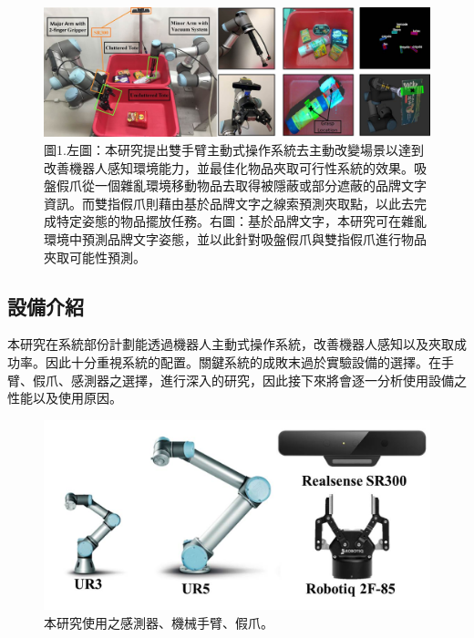 \begin{figure}[ht]
	\centering
	\includegraphics[height=!, width=1.0\linewidth, keepaspectratio=true]
	{./figures/hardware_archi.jpg}
  \caption{圖1.左圖：本研究提出雙手臂主動式操作系統去主動改變場景以達到改善機器人感知環境能力，並最佳化物品夾取可行性系統的效果。吸盤假爪從一個雜亂環境移動物品去取得被隱蔽或部分遮蔽的品牌文字資訊。而雙指假爪則藉由基於品牌文字之線索預測夾取點，以此去完成特定姿態的物品擺放任務。右圖：基於品牌文字，本研究可在雜亂環境中預測品牌文字姿態，並以此針對吸盤假爪與雙指假爪進行物品夾取可能性預測。}
  \label{figure:hardware_archi}
\end{figure}


\subsection{設備介紹}
本研究在系統部份計劃能透過機器人主動式操作系統，改善機器人感知以及夾取成功率。因此十分重視系統的配置。關鍵系統的成敗末過於實驗設備的選擇。在手臂、假爪、感測器之選擇，進行深入的研究，因此接下來將會逐一分析使用設備之性能以及使用原因。

\begin{figure}[ht]
	\centering
	\includegraphics[height=!, width=1.0\linewidth, keepaspectratio=true]
	{./figures/hardware_list.jpg}
  \caption{本研究使用之感測器、機械手臂、假爪。}
  \label{figure:hardware_list}
\end{figure}

